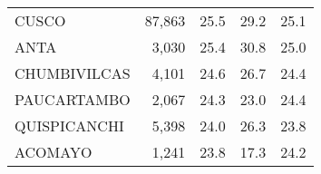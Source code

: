 \begin{tabular}{lrrrr}
	\cellcolor[HTML]{FD6864}CUSCO                                           & 87,863                                                                & 25.5                                                                             & 29.2                                                                        & 25.1                                                                                \\
	\cellcolor[HTML]{FD6864}ANTA                                            & 3,030                                                                 & 25.4                                                                             & 30.8                                                                        & 25.0                                                                                \\
	\cellcolor[HTML]{FD6864}CHUMBIVILCAS                                    & 4,101                                                                 & 24.6                                                                             & 26.7                                                                        & 24.4                                                                                \\
	\cellcolor[HTML]{FD6864}PAUCARTAMBO                                     & 2,067                                                                 & 24.3                                                                             & 23.0                                                                        & 24.4                                                                                \\
	\cellcolor[HTML]{FD6864}QUISPICANCHI                                    & 5,398                                                                 & 24.0                                                                             & 26.3                                                                        & 23.8                                                                                \\
	\cellcolor[HTML]{FD6864}ACOMAYO                                         & 1,241                                                                 & 23.8                                                                             & 17.3                                                                        & 24.2                                                                                \\

\end{tabular}
